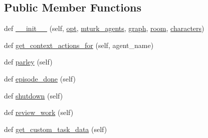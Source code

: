 \subsection*{Public Member Functions}
\begin{DoxyCompactItemize}
\item 
def \hyperlink{classlight__chats_1_1worlds_1_1LightChatTaskWorld_a5ace94e512c57a19b5d25973c9db5346}{\+\_\+\+\_\+init\+\_\+\+\_\+} (self, \hyperlink{classparlai_1_1core_1_1worlds_1_1World_a3640d92718acd3e6942a28c1ab3678bd}{opt}, \hyperlink{classlight__chats_1_1worlds_1_1LightChatTaskWorld_a03c483980d5fccf72cfa649cd03c2f77}{mturk\+\_\+agents}, \hyperlink{classlight__chats_1_1worlds_1_1LightChatTaskWorld_aded32ffc23a823ecc788982d2748fd18}{graph}, \hyperlink{classlight__chats_1_1worlds_1_1LightChatTaskWorld_a64f0056e716241b9baf5347bf6aa8b62}{room}, \hyperlink{classlight__chats_1_1worlds_1_1LightChatTaskWorld_a5da5f77b33e3893c9f699b809de9d451}{characters})
\item 
def \hyperlink{classlight__chats_1_1worlds_1_1LightChatTaskWorld_aa5493f3cec24405a973fa476cf017594}{get\+\_\+context\+\_\+actions\+\_\+for} (self, agent\+\_\+name)
\item 
def \hyperlink{classlight__chats_1_1worlds_1_1LightChatTaskWorld_ab7abcdb2f6a25bd47ec17eb1e31e03cd}{parley} (self)
\item 
def \hyperlink{classlight__chats_1_1worlds_1_1LightChatTaskWorld_a758065eaf9af0097679e95a510e8f0ec}{episode\+\_\+done} (self)
\item 
def \hyperlink{classlight__chats_1_1worlds_1_1LightChatTaskWorld_aefa85361e9fb431d0494a2a343028554}{shutdown} (self)
\item 
def \hyperlink{classlight__chats_1_1worlds_1_1LightChatTaskWorld_aad1cde9025f1234e4e1ecaa463ecbfdd}{review\+\_\+work} (self)
\item 
def \hyperlink{classlight__chats_1_1worlds_1_1LightChatTaskWorld_ae833f9c90611842891f1af2b9c67b22c}{get\+\_\+custom\+\_\+task\+\_\+data} (self)
\end{DoxyCompactItemize}
